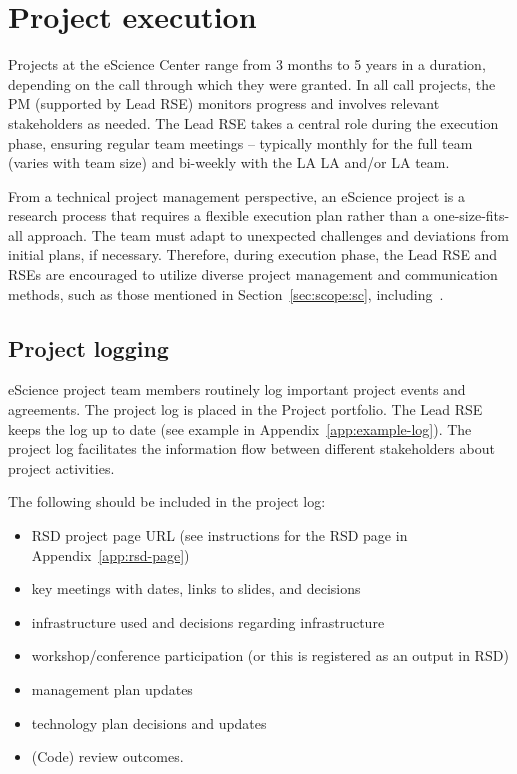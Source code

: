 \section{Project execution}
Projects at the eScience Center range from 3 months to 5 years in a duration, depending on the call through which they were
granted. In all call projects, the PM (supported by Lead RSE) monitors progress and involves relevant stakeholders as needed. 
The Lead RSE takes a central role during the execution phase, ensuring regular team meetings -- typically monthly for the full team (varies with team size) 
and bi-weekly with the LA LA and/or LA team.

From a technical project management perspective, an eScience project is a research process that requires a flexible execution plan rather than a one-size-fits-all approach.
The team must adapt to unexpected challenges and deviations from initial plans, if necessary. Therefore, 
during execution phase, the Lead RSE and RSEs are encouraged to utilize diverse project management and communication methods, 
such as those mentioned in Section~\ref{sec:scope:sc}, including~\cite{the_turing_way-2023,microp3,scrum-guide,agilefirst2024shapeup,wilson2014best,beck2004xp}.


\subsection{Project logging}
\label{sec:exec:log}
eScience project team members routinely log important project events and agreements. The project log is placed in the
Project portfolio. The Lead RSE keeps the log up to
date (see example in Appendix~\ref{app:example-log}). The project log facilitates the information flow between
different stakeholders about project activities.

The following should be included in the project log:
\begin{itemize}[itemsep=-4pt,parsep=4pt]
\item RSD project page URL (see instructions for the RSD page in Appendix~\ref{app:rsd-page})
\item key meetings with dates, links to slides, and decisions
\item infrastructure used and decisions regarding infrastructure
\item workshop/conference participation (or this is registered as an output in RSD)
\item management plan updates
\item technology plan decisions and updates
\item (Code) review outcomes.
\end{itemize}

